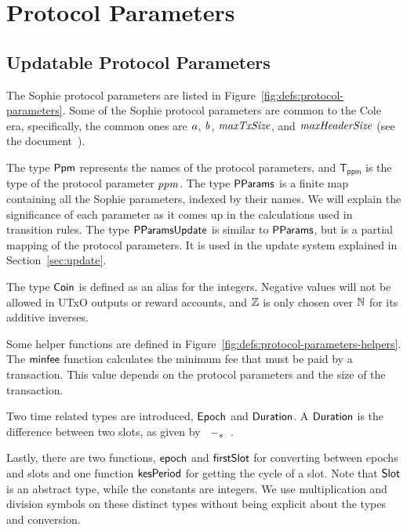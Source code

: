 \section{Protocol Parameters}
\label{sec:protocol-parameters}

\subsection{Updatable Protocol Parameters}
\label{sec:updatable-protocol-parameters}

The Sophie protocol parameters are listed in Figure~\ref{fig:defs:protocol-parameters}.
Some of the Sophie protocol parameters are common to the Cole era,
specifically, the common ones are $\mathit{a}$, $\mathit{b}$, $\mathit{maxTxSize}$, and
$\mathit{maxHeaderSize}$ (see the document~\cite{cole_ledger_spec}).

The type $\mathsf{Ppm}$ represents the names of the protocol parameters,
and $\mathsf{T_{ppm}}$ is the type of the protocol parameter $\mathit{ppm}$.
The type $\mathsf{PParams}$ is a finite map containing all the Sophie parameters,
indexed by their names.
We will explain the significance of each parameter as it comes up in
the calculations used in transition rules.
The type $\mathsf{PParamsUpdate}$ is similar to $\mathsf{PParams}$, but is
a partial mapping of the protocol parameters. It is used in the update
system explained in Section~\ref{sec:update}.

The type $\mathsf{Coin}$ is defined as an alias for the integers.
Negative values will not be allowed in UTxO outputs or reward accounts,
and $\mathbb{Z}$ is only chosen over $\mathbb{N}$ for its additive inverses.

Some helper functions are defined in Figure~\ref{fig:defs:protocol-parameters-helpers}.
The $\mathsf{minfee}$ function calculates the minimum fee that must be paid by a transaction.
This value depends on the protocol parameters and the size of the transaction.

Two time related types are introduced, $\mathsf{Epoch}$ and $\mathsf{Duration}$.
A $\mathsf{Duration}$ is the difference between two slots, as given by $\mathit{}~-_{s}~\mathit{}$.

Lastly, there are two functions, $\mathsf{epoch}$ and $\mathsf{firstSlot}$ for converting
between epochs and slots and one function $\mathsf{kesPeriod}$ for getting the cycle of a slot.
Note that $\mathsf{Slot}$ is an abstract type, while the constants are integers.
We use multiplication and division symbols on these distinct types
without being explicit about the types and conversion.

